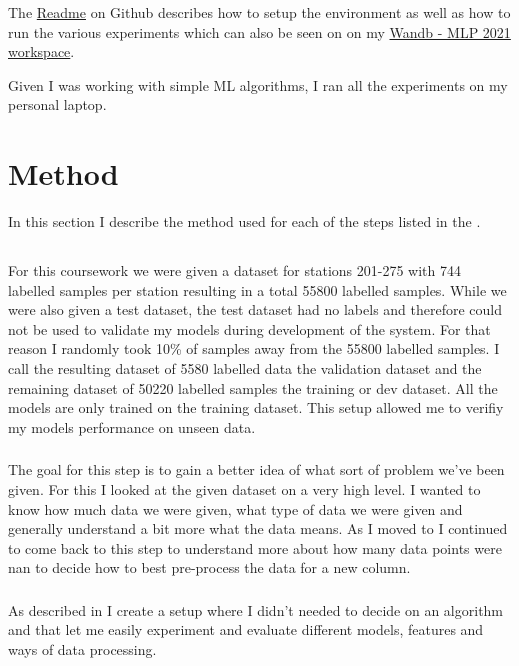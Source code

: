 \documentclass[a4paper]{article}
\begin{document}
    The \href{https://github.com/isabelladegen/mlp-2021}{Readme} on Github describes how to setup the environment as well
    as how to run the various experiments which can also be seen on on my \href{https://wandb.ai/idegen/mlp-2021}{Wandb - MLP 2021 workspace}.

    Given I was working with simple ML algorithms, I ran all the experiments on my personal laptop.


    \section{Method}\label{sec:method}

    In this section I describe the method used for each of the steps listed in the .

    \subsection*{}

    For this coursework we were given a dataset for stations 201-275 with 744 labelled samples per station
    resulting in a total 55800 labelled samples. While we were also given a test dataset, the test dataset had no labels
    and therefore could not be used to validate my models during development of the system. For that reason I randomly
    took 10\% of samples away from the 55800 labelled samples. I call the resulting dataset of 5580 labelled data the validation
    dataset and the remaining dataset of 50220 labelled samples the training or dev dataset. All the models are only
    trained on the training dataset. This setup allowed me to verifiy my models performance on unseen data.

    \subsubsection*{}
    The goal for this step is to gain a better idea of what sort of problem we've been given. For this I looked at the
    given dataset on a very high level. I wanted to know how much data we were given, what type of data we were given and
    generally understand
    a bit more what the data means. As I moved to  I continued to come back to this step
    to understand more about how many data points were nan to decide how to best pre-process the data for a new column.


    \subsubsection*{}
    As described in  I create a  setup where I didn't needed to decide
    on an algorithm and that let me easily experiment and evaluate different models, features and ways of data processing.
\end{document}
